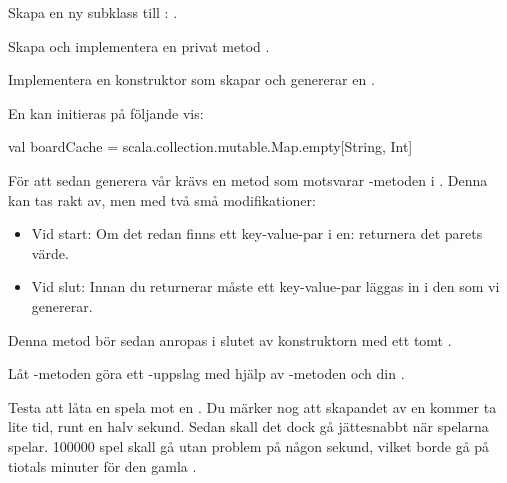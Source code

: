 \Subtask Skapa en ny subklass till : .

\Subtask Skapa och implementera en privat metod .

\Subtask Implementera en konstruktor som skapar och genererar en .

En  kan initieras på följande vis:
\begin{Code}
val boardCache = scala.collection.mutable.Map.empty[String, Int]
\end{Code}

För att sedan generera vår  krävs en metod som motsvarar -metoden i . Denna kan tas rakt av, men med två små modifikationer:
\begin{itemize}
\item Vid start: Om det redan finns ett key-value-par i en: returnera det parets värde.
\item Vid slut: Innan du returnerar måste ett key-value-par läggas in i den  som vi genererar.
\end{itemize}
Denna metod bör sedan anropas i slutet av konstruktorn med ett tomt .


\Subtask Låt -metoden göra ett -uppslag med hjälp av -metoden och din .

\Subtask Testa att låta en  spela mot en . Du märker nog att skapandet av en  kommer ta lite tid, runt en halv sekund. Sedan skall det dock gå jättesnabbt när spelarna spelar. 100000 spel skall gå utan problem på någon sekund, vilket borde gå på tiotals minuter för den gamla .
